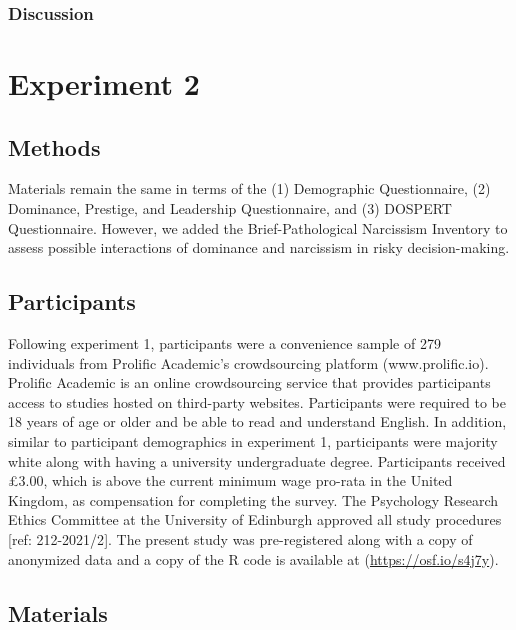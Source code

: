 \documentclass[
  donotrepeattitle,doc, 12pt, a4paper,floatsintext]{apa7}
\begin{document}
\hypertarget{discussion-1}{%
\subsubsection{Discussion}\label{discussion-1}}

\hypertarget{experiment-2-1}{%
\section{Experiment 2}\label{experiment-2-1}}

\hypertarget{methods-2}{%
\subsection{Methods}\label{methods-2}}

Materials remain the same in terms of the (1) Demographic Questionnaire, (2) Dominance, Prestige, and Leadership Questionnaire, and (3) DOSPERT Questionnaire. However, we added the Brief-Pathological Narcissism Inventory to assess possible interactions of dominance and narcissism in risky decision-making.

\hypertarget{participants-2}{%
\subsection{Participants}\label{participants-2}}

Following experiment 1, participants were a convenience sample of 279 individuals from Prolific Academic's crowdsourcing platform (www.prolific.io). Prolific Academic is an online crowdsourcing service that provides participants access to studies hosted on third-party websites. Participants were required to be 18 years of age or older and be able to read and understand English. In addition, similar to participant demographics in experiment 1, participants were majority white along with having a university undergraduate degree. Participants received £3.00, which is above the current minimum wage pro-rata in the United Kingdom, as compensation for completing the survey. The Psychology Research Ethics Committee at the University of Edinburgh approved all study procedures {[}ref: 212-2021/2{]}. The present study was pre-registered along with a copy of anonymized data and a copy of the R code is available at (\url{https://osf.io/s4j7y}).

\hypertarget{materials-2}{%
\subsection{Materials}\label{materials-2}}
\end{document}
